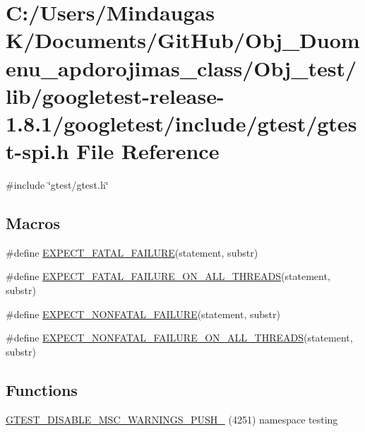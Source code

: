 \hypertarget{_obj__test_2lib_2googletest-release-1_88_81_2googletest_2include_2gtest_2gtest-spi_8h}{}\section{C\+:/\+Users/\+Mindaugas K/\+Documents/\+Git\+Hub/\+Obj\+\_\+\+Duomenu\+\_\+apdorojimas\+\_\+class/\+Obj\+\_\+test/lib/googletest-\/release-\/1.8.1/googletest/include/gtest/gtest-\/spi.h File Reference}
\label{_obj__test_2lib_2googletest-release-1_88_81_2googletest_2include_2gtest_2gtest-spi_8h}
{\ttfamily \#include \char`\"{}gtest/gtest.\+h\char`\"{}}\newline
\subsection*{Macros}
\begin{DoxyCompactItemize}
\item 
\#define \mbox{\hyperlink{_obj__test_2lib_2googletest-release-1_88_81_2googletest_2include_2gtest_2gtest-spi_8h_a819a3fd7f8b8cf24b6f1b3a26708973d}{E\+X\+P\+E\+C\+T\+\_\+\+F\+A\+T\+A\+L\+\_\+\+F\+A\+I\+L\+U\+RE}}(statement,  substr)
\item 
\#define \mbox{\hyperlink{_obj__test_2lib_2googletest-release-1_88_81_2googletest_2include_2gtest_2gtest-spi_8h_ad8aac5bc859b2ddc07583636ae4f45cf}{E\+X\+P\+E\+C\+T\+\_\+\+F\+A\+T\+A\+L\+\_\+\+F\+A\+I\+L\+U\+R\+E\+\_\+\+O\+N\+\_\+\+A\+L\+L\+\_\+\+T\+H\+R\+E\+A\+DS}}(statement,  substr)
\item 
\#define \mbox{\hyperlink{_obj__test_2lib_2googletest-release-1_88_81_2googletest_2include_2gtest_2gtest-spi_8h_a8376fd6821bd88fd806697355e79e138}{E\+X\+P\+E\+C\+T\+\_\+\+N\+O\+N\+F\+A\+T\+A\+L\+\_\+\+F\+A\+I\+L\+U\+RE}}(statement,  substr)
\item 
\#define \mbox{\hyperlink{_obj__test_2lib_2googletest-release-1_88_81_2googletest_2include_2gtest_2gtest-spi_8h_a9f4cf1f150fe9facfc4cbf0bae646ee9}{E\+X\+P\+E\+C\+T\+\_\+\+N\+O\+N\+F\+A\+T\+A\+L\+\_\+\+F\+A\+I\+L\+U\+R\+E\+\_\+\+O\+N\+\_\+\+A\+L\+L\+\_\+\+T\+H\+R\+E\+A\+DS}}(statement,  substr)
\end{DoxyCompactItemize}
\subsection*{Functions}
\begin{DoxyCompactItemize}
\item 
\mbox{\hyperlink{_obj__test_2lib_2googletest-release-1_88_81_2googletest_2include_2gtest_2gtest-spi_8h_a88f79832f9d045112a76e9da8611cc13}{G\+T\+E\+S\+T\+\_\+\+D\+I\+S\+A\+B\+L\+E\+\_\+\+M\+S\+C\+\_\+\+W\+A\+R\+N\+I\+N\+G\+S\+\_\+\+P\+U\+S\+H\+\_\+}} (4251) namespace testing
\end{DoxyCompactItemize}


